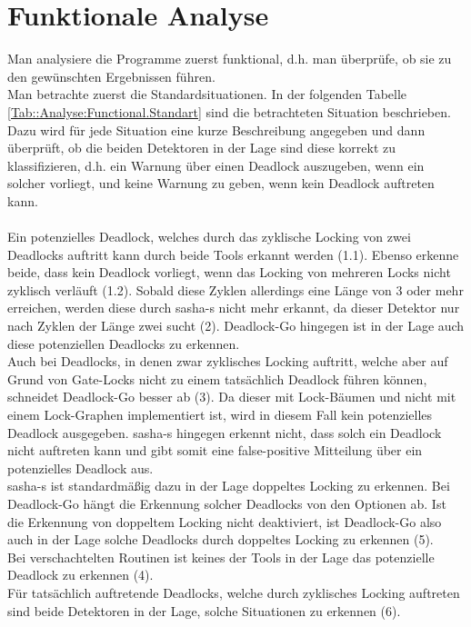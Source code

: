 \section{Funktionale Analyse}
Man analysiere die Programme zuerst funktional, d.h. man überprüfe, ob sie zu den 
gewünschten Ergebnissen führen.\\
Man betrachte zuerst die Standardsituationen. In der folgenden Tabelle 
\ref{Tab::Analyse:Functional.Standart} sind die 
betrachteten Situation beschrieben. Dazu wird für jede Situation eine kurze 
Beschreibung angegeben und dann überprüft, ob die beiden Detektoren in der Lage 
sind diese korrekt zu klassifizieren, d.h. ein Warnung über einen Deadlock auszugeben,
wenn ein solcher vorliegt, und keine Warnung zu geben, wenn kein Deadlock auftreten
kann.\\\\
Ein potenzielles Deadlock, welches 
durch das zyklische Locking von zwei Deadlocks auftritt kann durch beide Tools
erkannt werden (1.1). Ebenso erkenne beide, dass kein Deadlock vorliegt, wenn das 
Locking von mehreren Locks nicht zyklisch verläuft (1.2).
Sobald diese Zyklen allerdings eine Länge von 3 oder mehr 
erreichen, werden diese durch sasha-s nicht mehr erkannt, da dieser 
Detektor nur nach Zyklen der Länge zwei sucht (2). Deadlock-Go 
hingegen ist in der Lage auch diese potenziellen Deadlocks zu erkennen.\\
Auch bei Deadlocks, in denen zwar zyklisches Locking auftritt, welche aber 
auf Grund von Gate-Locks nicht zu einem tatsächlich Deadlock führen können,
schneidet Deadlock-Go besser ab (3). Da dieser mit Lock-Bäumen und nicht mit einem
Lock-Graphen implementiert ist, wird in diesem Fall kein potenzielles Deadlock 
ausgegeben. sasha-s hingegen erkennt nicht, dass solch ein Deadlock nicht 
auftreten kann und gibt somit eine false-positive Mitteilung über ein potenzielles 
Deadlock aus.\\ 
sasha-s ist standardmäßig dazu in  der Lage doppeltes Locking zu erkennen.
Bei Deadlock-Go hängt die Erkennung solcher Deadlocks von den Optionen ab.
Ist die Erkennung von doppeltem Locking nicht deaktiviert, ist Deadlock-Go also auch in 
der Lage solche Deadlocks durch doppeltes Locking zu erkennen (5). \\ 
Bei verschachtelten Routinen ist 
keines der Tools in der Lage das potenzielle Deadlock zu erkennen (4).\\
Für tatsächlich auftretende Deadlocks, welche durch zyklisches Locking auftreten 
sind beide Detektoren in der Lage, solche Situationen zu erkennen (6).\\\\
